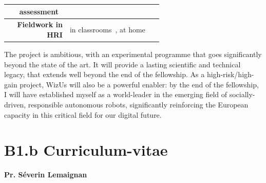 \documentclass[11pt,a4paper]{report}
\newcommand{\project}{WizUs\xspace}
\newcommand{\eu}[1]{}
\begin{document}
\begin{table}[h]
\begin{tabular}{rp{0.6\linewidth}}
        assessment~\cite{lemaignan2018underworlds,sallami2019simulation} \\
        \midrule
        \textbf{Fieldwork in HRI} & \small in
        classrooms~\cite{hood2015when, lemaignan2016learning, jacq2016building,
        baxter2015wider,kennedy2016cautious,senft2018robots}, at home~\cite{mondada2015ranger}\\
        \bottomrule
    \end{tabular}
    \label{pi-expertise}
\end{table}

The project is ambitious, with an experimental programme that goes significantly
beyond the state of the art. It will provide a lasting scientific and
technical legacy, that extends well beyond the end of the fellowship. As a
high-risk/high-gain project, \project will also be a powerful enabler: by the
end of the fellowship, I will have established myself as a world-leader in the
emerging field of socially-driven, responsible autonomous robots, significantly
reinforcing the European capacity in this critical field for our digital future.



\newpage

\printbibliography





\newpage

\chapter{B1.b Curriculum-vitae}\label{the-principal-investigator}


{\LARGE \bf Pr. Séverin Lemaignan}
\end{document}
